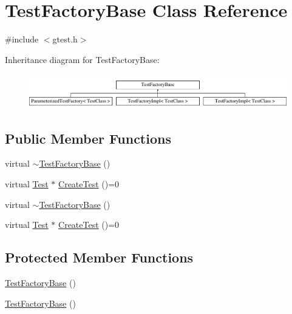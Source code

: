 \hypertarget{classtesting_1_1internal_1_1TestFactoryBase}{\section{\-Test\-Factory\-Base \-Class \-Reference}
\label{d0/deb/classtesting_1_1internal_1_1TestFactoryBase}
}


{\ttfamily \#include $<$gtest.\-h$>$}

\-Inheritance diagram for \-Test\-Factory\-Base\-:\begin{figure}[H]
\begin{center}
\leavevmode
\includegraphics[height=1.517615cm]{d0/deb/classtesting_1_1internal_1_1TestFactoryBase}
\end{center}
\end{figure}
\subsection*{\-Public \-Member \-Functions}
\begin{DoxyCompactItemize}
\item 
virtual \hyperlink{classtesting_1_1internal_1_1TestFactoryBase_ad1caa56f70c11f47320e43cd0b1885dc}{$\sim$\-Test\-Factory\-Base} ()
\item 
virtual \hyperlink{classtesting_1_1Test}{\-Test} $\ast$ \hyperlink{classtesting_1_1internal_1_1TestFactoryBase_a54ad95f17b20927fd00c337710813519}{\-Create\-Test} ()=0
\item 
virtual \hyperlink{classtesting_1_1internal_1_1TestFactoryBase_ad1caa56f70c11f47320e43cd0b1885dc}{$\sim$\-Test\-Factory\-Base} ()
\item 
virtual \hyperlink{classtesting_1_1Test}{\-Test} $\ast$ \hyperlink{classtesting_1_1internal_1_1TestFactoryBase_a54ad95f17b20927fd00c337710813519}{\-Create\-Test} ()=0
\end{DoxyCompactItemize}
\subsection*{\-Protected \-Member \-Functions}
\begin{DoxyCompactItemize}
\item 
\hyperlink{classtesting_1_1internal_1_1TestFactoryBase_a29dc02b271a58548a72a9440595d58f9}{\-Test\-Factory\-Base} ()
\item 
\hyperlink{classtesting_1_1internal_1_1TestFactoryBase_a29dc02b271a58548a72a9440595d58f9}{\-Test\-Factory\-Base} ()
\end{DoxyCompactItemize}
